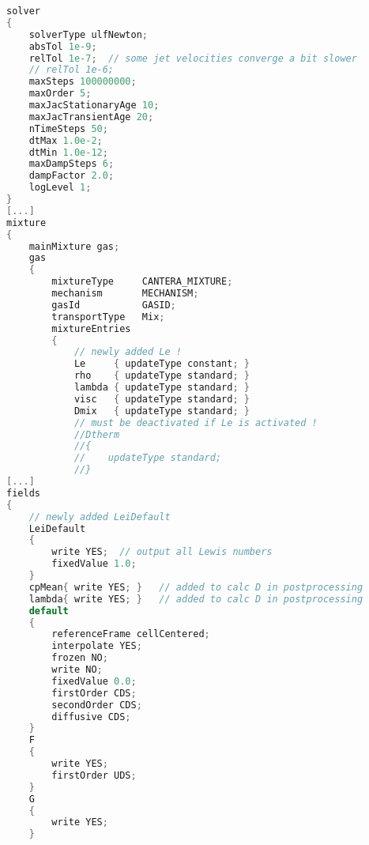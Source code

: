 \begin{lstlisting}[language=C++,label=lst:oppdiff,caption={Auszug aus \lstinline!oppdiffjet_ct_template.ulf!}]
solver
{
    solverType ulfNewton;
	absTol 1e-9;
	relTol 1e-7;  // some jet velocities converge a bit slower
	// relTol 1e-6;
	maxSteps 100000000;
	maxOrder 5;
    maxJacStationaryAge 10;
    maxJacTransientAge 20;
    nTimeSteps 50;
    dtMax 1.0e-2;
    dtMin 1.0e-12;
    maxDampSteps 6;
    dampFactor 2.0;
    logLevel 1;
}
[...]
mixture
{
    mainMixture gas;
    gas
    {
        mixtureType     CANTERA_MIXTURE;
        mechanism       MECHANISM;
        gasId           GASID;
        transportType   Mix;
        mixtureEntries
        {
            // newly added Le !
            Le     { updateType constant; }
            rho    { updateType standard; }
            lambda { updateType standard; }
            visc   { updateType standard; }
            Dmix   { updateType standard; }
            // must be deactivated if Le is activated !
            //Dtherm
            //{
            //    updateType standard;
            //}
[...]
fields
{
    // newly added LeiDefault
    LeiDefault
    {
        write YES;  // output all Lewis numbers
        fixedValue 1.0;
    }
    cpMean{ write YES; }   // added to calc D in postprocessing
    lambda{ write YES; }   // added to calc D in postprocessing
	default
	{
		referenceFrame cellCentered;
		interpolate YES;
		frozen NO;
		write NO;
		fixedValue 0.0;
		firstOrder CDS;
		secondOrder CDS;
		diffusive CDS;
	}
    F
    {
		write YES;
		firstOrder UDS;
    }
    G
    {
		write YES;
    }
\end{lstlisting}




